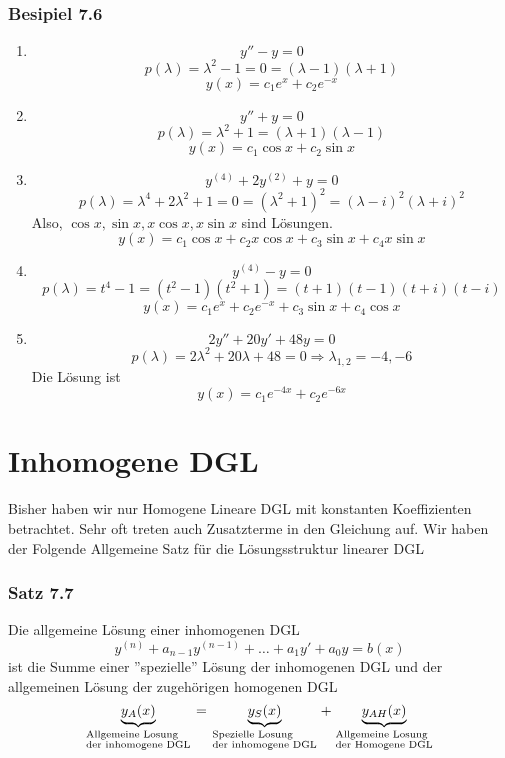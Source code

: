 \subsubsection*{Besipiel 7.6}
\begin{enumerate}
\item $$y''-y=0$$
$$p(\lambda)=\lambda^2-1=0=(\lambda-1)(\lambda+1)$$
$$y(x)=c_1e^x+c_2e^{-x}$$
\item $$y''+y=0$$
$$p(\lambda)=\lambda^2+1=(\lambda+1)(\lambda-1)$$
$$y(x)=c_1\cos x+c_2\sin x$$
\item $$y^{(4)}+2y^{(2)}+y=0$$
$$p(\lambda)=\lambda^4+2\lambda^2+1=0=(\lambda^2+1)^2=(\lambda-i)^2(\lambda+i)^2$$
Also, $\cos x, \sin x, x\cos x,x\sin x$ sind Lösungen. $$y(x)=c_1\cos x+c_2 x\cos x+c_3\sin x+c_4 x\sin x$$
\item $$y^{(4)}-y=0$$
$$p(\lambda)=t^4-1=(t^2-1)(t^2+1)=(t+1)(t-1)(t+i)(t-i)$$
$$y(x)=c_1e^x+c_2e^{-x}+c_3\sin x+c_4\cos x$$
\item $$2y''+20y'+48y=0$$
$$p(\lambda)=2\lambda^2 +20\lambda+48=0\Rightarrow \lambda_{1,2}=-4,-6$$ 
Die Lösung ist $$y(x)=c_1e^{-4x}+c_2e^{-6x}$$
\end{enumerate}
\section{Inhomogene DGL}
Bisher haben wir nur Homogene Lineare DGL mit konstanten Koeffizienten betrachtet. Sehr oft treten auch Zusatzterme in den Gleichung auf. Wir haben der Folgende Allgemeine Satz für die Lösungsstruktur linearer DGL
\subsubsection*{Satz 7.7}
Die allgemeine Lösung einer inhomogenen DGL $$y^{(n)}+a_{n-1}y^{(n-1)}+\dots +a_1y'+a_0y=b(x)$$ ist die Summe einer ''spezielle'' Lösung der inhomogenen DGL und der allgemeinen Lösung der zugehörigen homogenen DGL $$\underbrace {{y_A}(x)}_{\scriptstyle{\text{Allgemeine Losung }}\hfill\atop
\scriptstyle{\text{der inhomogene DGL}}\hfill} = \underbrace {{y_S}(x)}_{\scriptstyle{\text{Spezielle Losung }}\hfill\atop
\scriptstyle{\text{der inhomogene DGL}}\hfill} + \underbrace {{y_{AH}}(x)}_{\scriptstyle{\text{Allgemeine Losung }}\hfill\atop
\scriptstyle{\text{der Homogene DGL}}\hfill}$$
